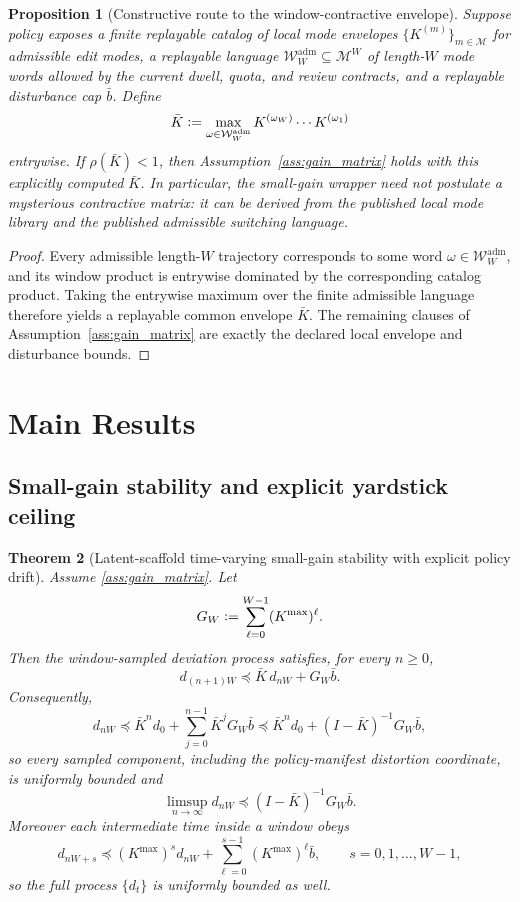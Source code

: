 \documentclass[11pt]{article}
\newtheorem{theorem}{Theorem}[section]
\newtheorem{proposition}[theorem]{Proposition}
\theoremstyle{definition}
\newcommand{\1}{\mathbf{1}}
\newcommand{\Defeq}{\vcentcolon=}
\begin{document}
\begin{proposition}[Constructive route to the window-contractive envelope]\label{prop:constructive_window}
Suppose policy exposes a finite replayable catalog of local mode envelopes $\{K^{(m)}\}_{m\in\mathcal M}$ for admissible edit modes, a replayable language $\mathcal W_W^{\mathrm{adm}}\subseteq \mathcal M^W$ of length-$W$ mode words allowed by the current dwell, quota, and review contracts, and a replayable disturbance cap $\bar b$. Define
\[
\bar K\Defeq \max_{\omega\in\mathcal W_W^{\mathrm{adm}}} K^{(\omega_W)}\cdots K^{(\omega_1)}
\]
entrywise. If $\rho(\bar K)<1$, then Assumption~\ref{ass:gain_matrix} holds with this explicitly computed $\bar K$. In particular, the small-gain wrapper need not postulate a mysterious contractive matrix: it can be derived from the published local mode library and the published admissible switching language.
\end{proposition}

\begin{proof}
Every admissible length-$W$ trajectory corresponds to some word $\omega\in\mathcal W_W^{\mathrm{adm}}$, and its window product is entrywise dominated by the corresponding catalog product. Taking the entrywise maximum over the finite admissible language therefore yields a replayable common envelope $\bar K$. The remaining clauses of Assumption~\ref{ass:gain_matrix} are exactly the declared local envelope and disturbance bounds.
\end{proof}

\section{Main Results}
\subsection{Small-gain stability and explicit yardstick ceiling}
\begin{theorem}[Latent-scaffold time-varying small-gain stability with explicit policy drift]\label{thm:small_gain}
Assume \ref{ass:gain_matrix}. Let
\[
G_W\Defeq \sum_{\ell=0}^{W-1}(K^{\max})^{\ell}.
\]
Then the window-sampled deviation process satisfies, for every $n\ge 0$,
\[
d_{(n+1)W}
\preceq
\bar K\, d_{nW} + G_W\bar b.
\]
Consequently,
\[
d_{nW}
\preceq
\bar K^n d_0 + \sum_{j=0}^{n-1}\bar K^j G_W\bar b
\preceq
\bar K^n d_0 + (I-\bar K)^{-1}G_W\bar b,
\]
so every sampled component, including the policy-manifest distortion coordinate, is uniformly bounded and
\[
\limsup_{n\to\infty} d_{nW}\preceq (I-\bar K)^{-1}G_W\bar b.
\]
Moreover each intermediate time inside a window obeys
\[
d_{nW+s}\preceq (K^{\max})^s d_{nW} + \sum_{\ell=0}^{s-1}(K^{\max})^{\ell}\bar b,
\qquad s=0,1,\dots,W-1,
\]
so the full process $\{d_t\}$ is uniformly bounded as well.
\end{theorem}
\end{document}
